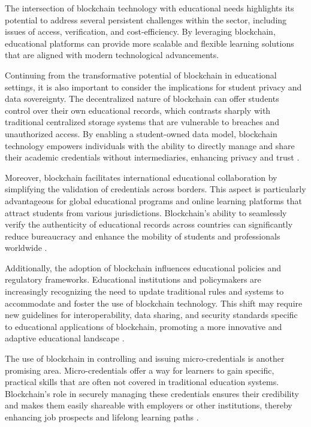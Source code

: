 \documentclass[12pt]{report}
\begin{document}
The intersection of blockchain technology with educational needs highlights its potential to address several persistent challenges within the sector, including issues of access, verification, and cost-efficiency. By leveraging blockchain, educational platforms can provide more scalable and flexible learning solutions that are aligned with modern technological advancements.

Continuing from the transformative potential of blockchain in educational settings, it is also important to consider the implications for student privacy and data sovereignty. The decentralized nature of blockchain can offer students control over their own educational records, which contrasts sharply with traditional centralized storage systems that are vulnerable to breaches and unauthorized access. By enabling a student-owned data model, blockchain technology empowers individuals with the ability to directly manage and share their academic credentials without intermediaries, enhancing privacy and trust \cite{privacyBlockchain}.

Moreover, blockchain facilitates international educational collaboration by simplifying the validation of credentials across borders. This aspect is particularly advantageous for global educational programs and online learning platforms that attract students from various jurisdictions. Blockchain's ability to seamlessly verify the authenticity of educational records across countries can significantly reduce bureaucracy and enhance the mobility of students and professionals worldwide \cite{internationalBlockchain}.

Additionally, the adoption of blockchain influences educational policies and regulatory frameworks. Educational institutions and policymakers are increasingly recognizing the need to update traditional rules and systems to accommodate and foster the use of blockchain technology. This shift may require new guidelines for interoperability, data sharing, and security standards specific to educational applications of blockchain, promoting a more innovative and adaptive educational landscape \cite{policyBlockchain}.

The use of blockchain in controlling and issuing micro-credentials is another promising area. Micro-credentials offer a way for learners to gain specific, practical skills that are often not covered in traditional education systems. Blockchain's role in securely managing these credentials ensures their credibility and makes them easily shareable with employers or other institutions, thereby enhancing job prospects and lifelong learning paths \cite{microCredentialsBlockchain}.
\end{document}
